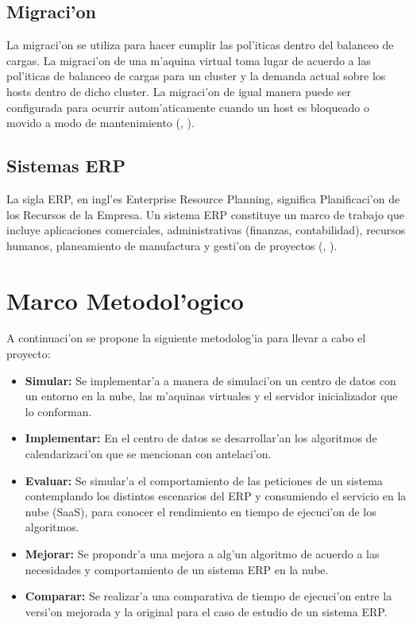 \subsection*{Migraci'on}

La migraci'on se utiliza para hacer cumplir las pol'iticas dentro del balanceo de cargas. La migraci'on de una m'aquina virtual toma lugar de acuerdo a las pol'iticas de balanceo de cargas para un cluster y la demanda actual sobre los hosts dentro de dicho cluster. La migraci'on de igual manera puede ser configurada para ocurrir autom'aticamente cuando un host es bloqueado o movido a modo de mantenimiento (\citeauthor{redhat}, \citeyear{redhat}).
\subsection*{Sistemas ERP}

La sigla ERP, en ingl'es Enterprise Resource Planning, significa Planificaci'on de los Recursos de la Empresa. Un sistema ERP constituye un marco de trabajo que incluye aplicaciones comerciales, administrativas (finanzas, contabilidad), recursos humanos, planeamiento de manufactura y gesti'on de proyectos (\citeauthor{saroka2002sistemas}, \citeyear{saroka2002sistemas}). 


\section{Marco Metodol'ogico}

A continuaci'on se propone la siguiente metodolog'ia para llevar a cabo el proyecto:

\begin{itemize}
	\item \textbf{Simular:} Se implementar'a a manera de simulaci'on un centro de datos con un entorno en la nube, las m'aquinas virtuales y el servidor inicializador que lo conforman.
	\item \textbf{Implementar:} En el centro de datos se desarrollar'an los algoritmos de calendarizaci'on que se mencionan con antelaci'on.
	\item \textbf{Evaluar:} Se simular'a el comportamiento de las peticiones de un sistema contemplando los distintos escenarios del ERP y consumiendo el servicio en la nube (SaaS), para conocer el rendimiento en tiempo de ejecuci'on de los algoritmos.
	\item \textbf{Mejorar:} Se propondr'a una mejora a alg'un algoritmo de acuerdo a las necesidades y comportamiento de un sistema ERP en la nube.
	\item \textbf{Comparar:} Se realizar'a una comparativa de tiempo de ejecuci'on entre la versi'on mejorada y la original para el caso de estudio de un sistema ERP.
\end{itemize}





